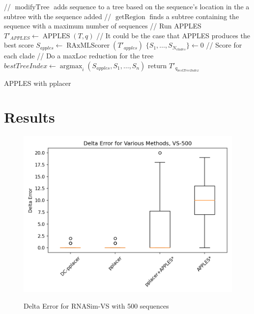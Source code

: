\documentclass[10pt]{article}
\begin{document}
\begin{algorithm}[H]
\SetAlgoLined
{}
 // $\operatorname{modifyTree}$ adds sequence to a tree based on the sequence's location in the a subtree with the sequence added\;
 // $\operatorname{getRegion}$ finds a subtree containing the sequence with a maximum number of sequences\;
  // Run APPLES\;
  $T'_{APPLES} \leftarrow \operatorname{APPLES}(T, q)$\;
  // It could be the case that APPLES produces the best score\;
  $S_{apples} \leftarrow \operatorname{RAxMLScorer}( T'_{apples})$\;
  $\{S_1, \dots, S_{N_{clades}}\} \leftarrow 0$ // Score for each clade\;
 // Do a maxLoc reduction for the tree\;
 $bestTreeIndex \leftarrow \operatorname{argmax}_{i} (S_{apples},S_1,\dots,S_n)$\;
 return $T'_{q_{bestTreeIndex}}$\;
\caption{APPLES with pplacer}
 \label{alg:approach2}
\end{algorithm}

\section{Results}

\begin{figure}[h]
\centering
\includegraphics[width=\textwidth]{Figs/VS-delta-error-500.png}
\label{fig:error500}
\caption{Delta Error for RNASim-VS with 500 sequences}
\end{figure}
\end{document}
